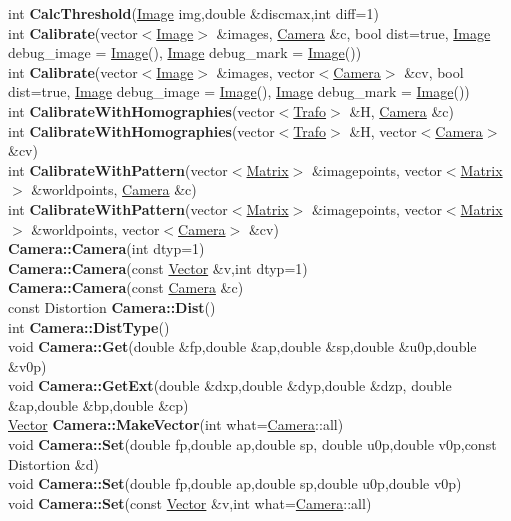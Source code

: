 \documentclass[10pt,titlepage]{article}
\def\functionlistentry#1#2#3#4#5#6{\noindent #1 {\bf #2}(#3) \dotfill #6\\}
\begin{document}
{{\functionlistentry{int}{CalcThreshold}{\hyperlink{Image}{Image} img,double \&discmax,int diff=1}{437}{conturs}{}
\functionlistentry{int}{Calibrate}{vector$<$\hyperlink{Image}{Image}$>$ \&images, \hyperlink{Camera}{Camera} \&c, bool dist=true, \hyperlink{Image}{Image} debug\_image = \hyperlink{Image}{Image}(), \hyperlink{Image}{Image} debug\_mark = \hyperlink{Image}{Image}()}{792}{cameraModel}{}
\functionlistentry{int}{Calibrate}{vector$<$\hyperlink{Image}{Image}$>$ \&images, vector$<$\hyperlink{Camera}{Camera}$>$ \&cv, bool dist=true, \hyperlink{Image}{Image} debug\_image = \hyperlink{Image}{Image}(), \hyperlink{Image}{Image} debug\_mark = \hyperlink{Image}{Image}()}{793}{cameraModel}{}
\functionlistentry{int}{CalibrateWithHomographies}{vector$<$\hyperlink{Trafo}{Trafo}$>$ \&H, \hyperlink{Camera}{Camera} \&c}{799}{cameraModel}{}
\functionlistentry{int}{CalibrateWithHomographies}{vector$<$\hyperlink{Trafo}{Trafo}$>$ \&H, vector$<$\hyperlink{Camera}{Camera}$>$ \&cv}{800}{cameraModel}{}
\functionlistentry{int}{CalibrateWithPattern}{vector$<$\hyperlink{Matrix}{Matrix}$>$ \&imagepoints, vector$<$\hyperlink{Matrix}{Matrix}$>$ \&worldpoints, \hyperlink{Camera}{Camera} \&c}{797}{cameraModel}{}
\functionlistentry{int}{CalibrateWithPattern}{vector$<$\hyperlink{Matrix}{Matrix}$>$ \&imagepoints, vector$<$\hyperlink{Matrix}{Matrix}$>$ \&worldpoints, vector$<$\hyperlink{Camera}{Camera}$>$ \&cv}{798}{cameraModel}{}
\functionlistentry{}{Camera::Camera}{int dtyp=1}{770}{cameraModel}{}
\functionlistentry{}{Camera::Camera}{const \hyperlink{Vector}{Vector} \&v,int dtyp=1}{771}{cameraModel}{}
\functionlistentry{}{Camera::Camera}{const \hyperlink{Camera}{Camera} \&c}{772}{cameraModel}{}
\functionlistentry{const Distortion}{Camera::Dist}{}{779}{cameraModel}{}
\functionlistentry{int}{Camera::DistType}{}{780}{cameraModel}{}
\functionlistentry{void}{Camera::Get}{double \&fp,double \&ap,double \&sp,double \&u0p,double \&v0p}{777}{cameraModel}{}
\functionlistentry{void}{Camera::GetExt}{double \&dxp,double \&dyp,double \&dzp, double \&ap,double \&bp,double \&cp}{778}{cameraModel}{}
\functionlistentry{\hyperlink{Vector}{Vector}}{Camera::MakeVector}{int what=\hyperlink{Camera}{Camera}::all}{782}{cameraModel}{}
\functionlistentry{void}{Camera::Set}{double fp,double ap,double sp, double u0p,double v0p,const Distortion \&d}{774}{cameraModel}{}
\functionlistentry{void}{Camera::Set}{double fp,double ap,double sp,double u0p,double v0p}{775}{cameraModel}{}
\functionlistentry{void}{Camera::Set}{const \hyperlink{Vector}{Vector} \&v,int what=\hyperlink{Camera}{Camera}::all}{783}{cameraModel}{}
}}
\end{document}
